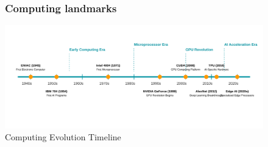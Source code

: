 \documentclass[aspectratio=169,t,xcolor=table]{beamer}
\begin{document}
\begin{frame}

\begin{figure}
    \frametitle{Computing landmarks}
    \vspace{-0.75cm}
    \centering
    \includegraphics[width=\textwidth]{figs/ai-hardware-timeline}  %
    \caption{Computing Evolution Timeline}
\end{figure}
\end{frame}
\end{document}
